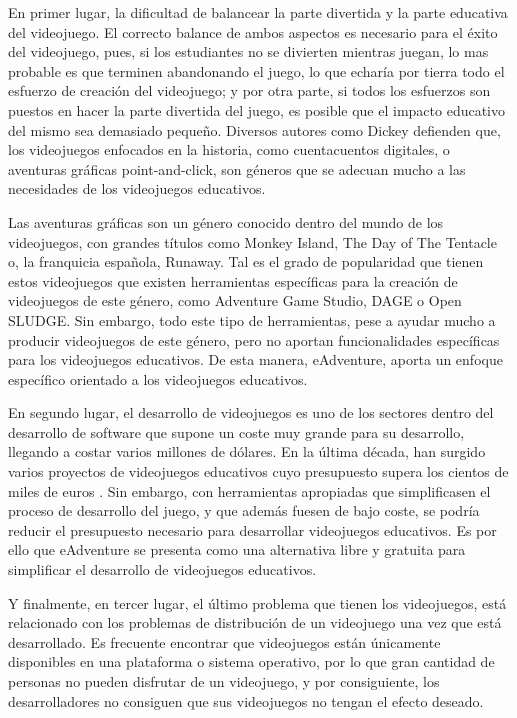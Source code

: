 En primer lugar, la dificultad de balancear la parte divertida y la parte educativa del videojuego. El correcto balance de ambos aspectos es necesario para el éxito del videojuego, pues, si los estudiantes no se divierten mientras juegan, lo mas probable es que terminen abandonando el juego, lo que echaría por tierra todo el esfuerzo de creación del videojuego; y por otra parte, si todos los esfuerzos son puestos en hacer la parte divertida del juego, es posible que el impacto educativo del mismo sea demasiado pequeño. Diversos autores como Dickey defienden que, los videojuegos enfocados en la historia, como cuentacuentos digitales, o aventuras gráficas point-and-click, son géneros que se adecuan mucho a las necesidades de los videojuegos educativos.

Las aventuras gráficas son un género conocido dentro del mundo de los videojuegos, con grandes títulos como Monkey Island, The Day of The Tentacle o, la franquicia española, Runaway. Tal es el grado de popularidad que tienen estos videojuegos que existen herramientas específicas para la creación de videojuegos de este género, como Adventure Game Studio, DAGE o Open SLUDGE. Sin embargo, todo este tipo de herramientas, pese a ayudar mucho a producir videojuegos de este género, pero no aportan funcionalidades específicas para los videojuegos educativos. De esta manera, eAdventure, aporta un enfoque específico orientado a los videojuegos educativos. 

En segundo lugar, el desarrollo de videojuegos es uno de los sectores dentro del desarrollo de software que supone un coste muy grande para su desarrollo, llegando a costar varios millones de dólares. En la última década, han surgido varios proyectos de videojuegos educativos cuyo presupuesto supera los cientos de miles de euros \cite{Michael2005}. Sin embargo, con herramientas apropiadas que simplificasen el proceso de desarrollo del juego, y que además fuesen de bajo coste, se podría reducir el presupuesto necesario para desarrollar videojuegos educativos. Es por ello que eAdventure se presenta como una alternativa libre y gratuita para simplificar el desarrollo de videojuegos educativos. 

Y finalmente, en tercer lugar, el último problema que tienen los videojuegos, está relacionado con los problemas de distribución de un videojuego una vez que está desarrollado. Es frecuente encontrar que videojuegos están únicamente
disponibles en una plataforma o sistema operativo, por lo que gran cantidad de personas no pueden disfrutar de un videojuego, y por consiguiente, los desarrolladores no consiguen que sus videojuegos no tengan el efecto deseado.

